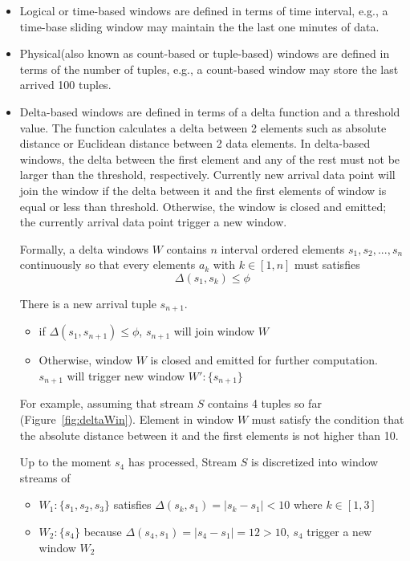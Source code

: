 \begin{itemize}
	\item Logical or time-based windows are defined in terms of time interval, e.g., a time-base sliding window may maintain the the last one minutes of data.
	
	\item Physical(also known as count-based or tuple-based) windows are defined in terms of the number of tuples, e.g., a count-based window may store the last arrived 100 tuples.
	
	\item Delta-based windows are defined in terms of a delta function and a threshold value. The function calculates a delta between 2 elements such as absolute distance or Euclidean distance between 2 data elements. In delta-based windows, the delta between the first element and any of the rest must not be larger than the threshold, respectively. Currently new arrival data point will join the window if the delta between it and the first elements of window is equal or less than threshold. Otherwise, the window is closed and emitted; the currently arrival data point trigger a new window. 
	
Formally, a delta windows $W$ contains $n$ interval ordered elements $s_1, s_2,...,s_n$ continuously so that every elements $a_k$ with $k \in [1,n]$ must satisfies
	\begin{equation}
		\Delta(s_1,s_k) \leq \phi
	\end{equation}

There is a new arrival tuple $s_{n+1}$.
\begin{itemize}
\item if $\Delta(s_1,s_{n+1}) \leq \phi$, $s_{n+1}$ will join window $W$
\item Otherwise, window $W$ is closed and emitted for further computation. $s_{n+1}$ will trigger new window $W': \{s_{n+1}\}$
\end{itemize}

	
For example, assuming that stream $S$ contains 4 tuples so far (Figure~\ref{fig:deltaWin}). Element in window $W$ must satisfy the condition that the absolute distance between it and the first elements is not higher than 10.

Up to the moment $s_4$ has processed, Stream $S$ is discretized into window streams of 
\begin{itemize}
\item $W_1:\{s_1,s_2, s_3\}$ satisfies $\Delta(s_k,s_1) =|s_k-s_1| < 10 $ where $k \in [1,3]$
\item $W_2:\{s_4\}$ because $\Delta(s_4,s_1) = |s_4-s_1| = 12 > 10$, $s_4$ trigger a new window $W_2$
\end{itemize}


\end{itemize}
